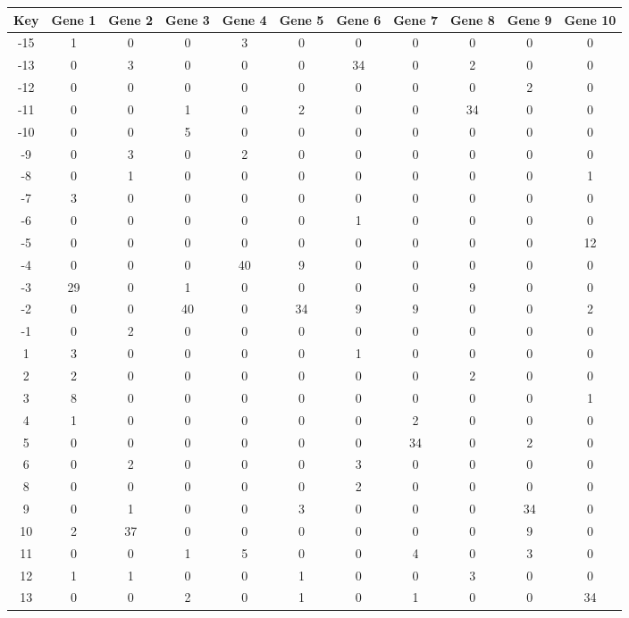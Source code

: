 \begin{tabular}{|c|c|c|c|c|c|c|c|c|c|c|}
\hline
Key & Gene 1 & Gene 2 & Gene 3 & Gene 4 & Gene 5 & Gene 6 & Gene 7 & Gene 8 & Gene 9 & Gene 10 \\
\hline
-15 & 1 & 0 & 0 & 3 & 0 & 0 & 0 & 0 & 0 & 0 \\
-13 & 0 & 3 & 0 & 0 & 0 & 34 & 0 & 2 & 0 & 0 \\
-12 & 0 & 0 & 0 & 0 & 0 & 0 & 0 & 0 & 2 & 0 \\
-11 & 0 & 0 & 1 & 0 & 2 & 0 & 0 & 34 & 0 & 0 \\
-10 & 0 & 0 & 5 & 0 & 0 & 0 & 0 & 0 & 0 & 0 \\
-9 & 0 & 3 & 0 & 2 & 0 & 0 & 0 & 0 & 0 & 0 \\
-8 & 0 & 1 & 0 & 0 & 0 & 0 & 0 & 0 & 0 & 1 \\
-7 & 3 & 0 & 0 & 0 & 0 & 0 & 0 & 0 & 0 & 0 \\
-6 & 0 & 0 & 0 & 0 & 0 & 1 & 0 & 0 & 0 & 0 \\
-5 & 0 & 0 & 0 & 0 & 0 & 0 & 0 & 0 & 0 & 12 \\
-4 & 0 & 0 & 0 & 40 & 9 & 0 & 0 & 0 & 0 & 0 \\
-3 & 29 & 0 & 1 & 0 & 0 & 0 & 0 & 9 & 0 & 0 \\
-2 & 0 & 0 & 40 & 0 & 34 & 9 & 9 & 0 & 0 & 2 \\
-1 & 0 & 2 & 0 & 0 & 0 & 0 & 0 & 0 & 0 & 0 \\
1 & 3 & 0 & 0 & 0 & 0 & 1 & 0 & 0 & 0 & 0 \\
2 & 2 & 0 & 0 & 0 & 0 & 0 & 0 & 2 & 0 & 0 \\
3 & 8 & 0 & 0 & 0 & 0 & 0 & 0 & 0 & 0 & 1 \\
4 & 1 & 0 & 0 & 0 & 0 & 0 & 2 & 0 & 0 & 0 \\
5 & 0 & 0 & 0 & 0 & 0 & 0 & 34 & 0 & 2 & 0 \\
6 & 0 & 2 & 0 & 0 & 0 & 3 & 0 & 0 & 0 & 0 \\
8 & 0 & 0 & 0 & 0 & 0 & 2 & 0 & 0 & 0 & 0 \\
9 & 0 & 1 & 0 & 0 & 3 & 0 & 0 & 0 & 34 & 0 \\
10 & 2 & 37 & 0 & 0 & 0 & 0 & 0 & 0 & 9 & 0 \\
11 & 0 & 0 & 1 & 5 & 0 & 0 & 4 & 0 & 3 & 0 \\
12 & 1 & 1 & 0 & 0 & 1 & 0 & 0 & 3 & 0 & 0 \\
13 & 0 & 0 & 2 & 0 & 1 & 0 & 1 & 0 & 0 & 34 \\
\hline
\end{tabular}